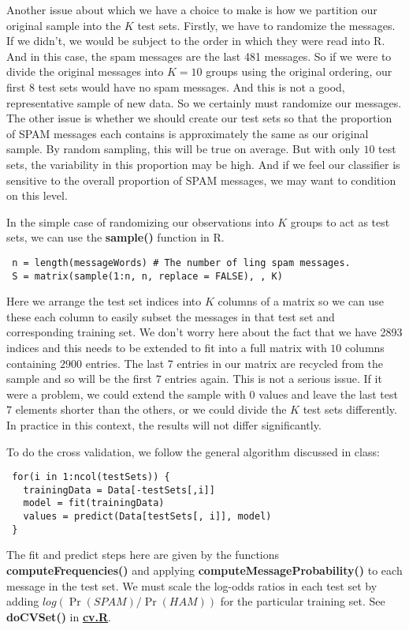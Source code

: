\documentclass{article}
\def\SFunction#1{\textbf{#1()}}
\def\file#1{\HREF{http://winnie.ucdavis.edu/stat141/Winter04/Homework/NaieveBayes/Solutions/#1}{\textbf{#1}}}
\def\HREF#1#2{\href{#1}{#2}}
\begin{document}
Another issue about which we have a choice to make is how we partition
our original sample into the $K$ test sets.  Firstly, we have to
randomize the messages. If we didn't, we would be subject to the order
in which they were read into R. And in this case, the spam messages
are the last 481 messages.  So if we were to divide the original
messages into $K = 10$ groups using the original ordering, our first
$8$ test sets would have no spam messages.  And this is not a good,
representative sample of new data.  So we certainly must randomize our
messages.  The other issue is whether we should create our test sets
so that the proportion of SPAM messages each contains is approximately
the same as our original sample.  By random sampling, this will be
true on average.  But with only $10$ test sets, the variability in
this proportion may be high. And if we feel our classifier is
sensitive to the overall proportion of SPAM messages, we may want to
condition on this level.

In the simple case of randomizing our observations
into $K$ groups to act as test sets, we can use
the \SFunction{sample} function in R.
\begin{verbatim}
 n = length(messageWords) # The number of ling spam messages.
 S = matrix(sample(1:n, n, replace = FALSE), , K)
\end{verbatim}
Here we arrange the test set indices into $K$ columns of a matrix so
we can use these each column to easily subset the messages in that
test set and corresponding training set.  We don't worry here about
the fact that we have 2893 indices and this needs to be extended to
fit into a full matrix with $10$ columns containing $2900$ entries.
The last 7 entries in our matrix are recycled from the sample and so
will be the first $7$ entries again.  This is not a serious issue. If
it were a problem, we could extend the sample with $0$ values and
leave the last test $7$ elements shorter than the others, or we could
divide the $K$ test sets differently.  In practice in this context,
the results will not differ significantly.


To do the cross validation, we follow the general algorithm
discussed in class:
\begin{verbatim}
 for(i in 1:ncol(testSets)) {
   trainingData = Data[-testSets[,i]]
   model = fit(trainingData) 
   values = predict(Data[testSets[, i]], model)
 }
\end{verbatim}
The fit and predict steps here are given by the functions
\SFunction{computeFrequencies} and applying
\SFunction{computeMessageProbability} to each message in the test set.
We must scale the log-odds ratios in each test set by adding
$log(\Pr(SPAM)/\Pr(HAM))$ for the particular training set.  See
\SFunction{doCVSet} in \file{cv.R}.
\end{document}
